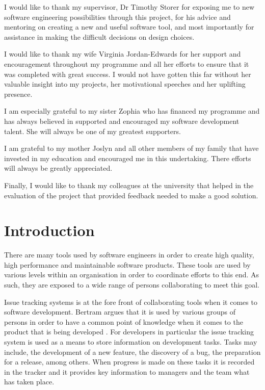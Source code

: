 \documentclass{mproj}
\begin{document}
I would like to thank my supervisor, Dr Timothy Storer for exposing me to new software engineering possibilities through this project, for his advice and mentoring on creating a new and useful software tool, and most importantly for assistance in making the difficult decisions on design choices.

I would like to thank my wife Virginia Jordan-Edwards for her support and encouragement throughout my programme and all her efforts to ensure that it was completed with great success. I would not have gotten this far without her valuable insight into my projects, her motivational speeches and her uplifting presence.

I am especially grateful to my sister Zophia who has financed my programme and has always believed in supported and encouraged my software development talent. She will always be one of my greatest supporters.

I am grateful to my mother Joslyn and all other members of my family that have invested in my education and encouraged me in this undertaking. There efforts will always be greatly appreciated.

Finally, I would like to thank my colleagues at the university that helped in the evaluation of the project that provided feedback needed to make a good solution.

\tableofcontents

\chapter{Introduction}\label{intro}

There are many tools used by software engineers in order to create high quality, high performance and maintainable software products. These tools are used by various levels within an organisation in order to coordinate efforts to this end. As such, they are exposed to a wide range of persons collaborating to meet this goal.

Issue tracking systems is at the fore front of collaborating tools when it comes to software development. Bertram argues that it is used by various groups of persons in order to have a common point of knowledge when it comes to the product that is being developed \cite{Bertram:2010}. For developers in particular the issue tracking system is used as a means to store information on development tasks. Tasks may include, the development of a new feature, the discovery of a bug, the preparation for a release, among others. When progress is made on these tasks it is recorded in the tracker and it provides key information to managers and the team what has taken place.
\end{document}
